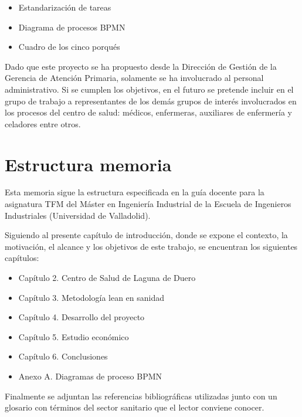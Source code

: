 \begin{itemize}
    \item Estandarización de tareas
    \item Diagrama de procesos BPMN
    \item Cuadro de los cinco porqués
\end{itemize}

Dado que este proyecto se ha propuesto desde la Dirección de Gestión de la Gerencia de Atención Primaria, solamente se ha involucrado al personal administrativo. Si se cumplen los objetivos, en el futuro se pretende incluir en el grupo de trabajo a representantes de los demás grupos de interés involucrados en los procesos del centro de salud: médicos, enfermeras, auxiliares de enfermería y celadores entre otros.

\section{Estructura memoria}

Esta memoria sigue la estructura especificada en la guía docente para la asignatura TFM del Máster en Ingeniería Industrial de la Escuela de Ingenieros Industriales (Universidad de Valladolid).

Siguiendo al presente capítulo de introducción, donde se expone el contexto, la motivación, el alcance y los objetivos de este trabajo, se encuentran los siguientes capítulos:

\begin{itemize}
    \item Capítulo 2. Centro de Salud de Laguna de Duero
    \item Capítulo 3. Metodología lean en sanidad
    \item Capítulo 4. Desarrollo del proyecto
    \item Capítulo 5. Estudio económico
    \item Capítulo 6. Conclusiones
    \item Anexo A. Diagramas de proceso BPMN
\end{itemize}

Finalmente se adjuntan las referencias bibliográficas utilizadas junto con un glosario con términos del sector sanitario que el lector conviene conocer.
